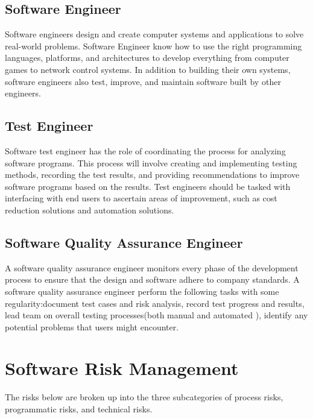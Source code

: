 \documentclass[letterpaper,12pt,oneside,listof=totoc]{scrreprt}
\begin{document}
    \subsection{Software Engineer} 
    Software engineers design and create computer systems and applications to solve real-world problems. Software Engineer know how to use the right programming languages, platforms, and architectures to develop everything from computer games to network control systems. In addition to building their own systems, software engineers also test, improve, and maintain software built by other engineers. 
    
    \subsection{Test Engineer} 
    Software test engineer has the role of coordinating the process for analyzing software programs. This process will involve creating and implementing testing methods, recording the test results, and providing recommendations to improve software programs based on the results. Test engineers should be tasked with interfacing with end users to ascertain areas of improvement, such as cost reduction solutions and automation solutions.
    
    \subsection{Software Quality Assurance Engineer} 
    A software quality assurance engineer monitors every phase of the development process to ensure that the design and software adhere to company standards.
    A software quality assurance engineer perform the following tasks with some regularity:﻿document test cases and risk analysis, record test progress and results, lead team on overall testing processes(both manual and automated ), identify any potential problems that users might encounter.
        
\newpage
\section{Software Risk Management} %
The risks below are broken up into the three subcategories of process risks, programmatic risks, and technical risks. 
\end{document}
